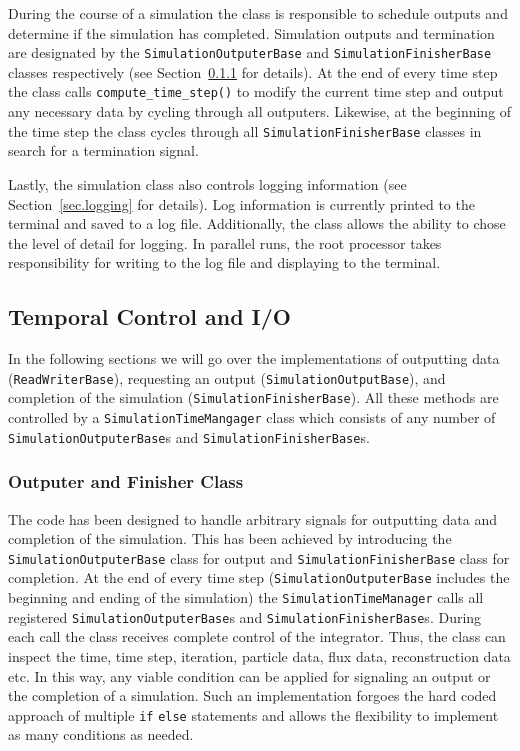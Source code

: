 During the course of a simulation the class is responsible to schedule outputs and
determine if the simulation has completed. Simulation outputs and termination are 
designated by the \lstinline{SimulationOutputerBase} and \lstinline{SimulationFinisherBase} 
classes respectively (see Section~\ref{sec.outputters} for details). At the end of every time
step the class calls \lstinline{compute_time_step()} to modify the current time step and
output any necessary data by cycling through all outputers. Likewise, at the beginning of
the time step the class cycles through all \lstinline{SimulationFinisherBase} classes 
in search for a termination signal.

Lastly, the simulation class also controls logging information (see Section~\ref{sec.logging}
for details). Log information is currently printed to the terminal and saved to a log file.
Additionally, the class allows the ability to chose the level of detail for logging.
In parallel runs, the root processor takes responsibility for writing to the log file
and displaying to the terminal.


\subsection{Temporal Control and I/O}
In the following sections we will go over the implementations of outputting data 
(\lstinline{ReadWriterBase}), requesting an output (\lstinline{SimulationOutputBase}), and completion
of the simulation (\lstinline{SimulationFinisherBase}). All these methods are controlled by a
\lstinline{SimulationTimeMangager} class which consists of any number of 
\lstinline{SimulationOutputerBase}s and \lstinline{SimulationFinisherBase}s.




\subsubsection{Outputer and Finisher Class}
\label{sec.outputters}

The code has been designed to handle arbitrary signals for outputting data
and completion of the simulation. This has been achieved by introducing the
\lstinline{SimulationOutputerBase} class for output and
\lstinline{SimulationFinisherBase} class for completion. At the end of every
time step (\lstinline{SimulationOutputerBase} includes the beginning and ending
of the simulation) the \lstinline{SimulationTimeManager} calls all registered
\lstinline{SimulationOutputerBase}s and \lstinline{SimulationFinisherBase}s.
During each call the class receives complete control of the integrator. Thus,
the class can inspect the time, time step, iteration, particle data, flux data,
reconstruction data etc. In this way, any viable condition can be applied
for signaling an output or the completion of a simulation. Such an implementation
forgoes the hard coded approach of multiple \texttt{if} \texttt{else} statements
and allows the flexibility to implement as many conditions as needed.

